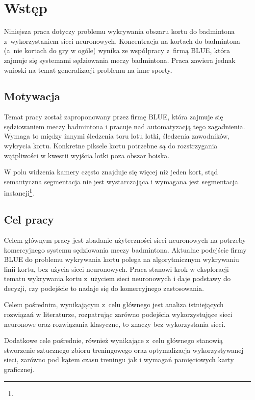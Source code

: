 \chapter{Wstęp}

Niniejsza praca dotyczy problemu wykrywania obszaru kortu do badmintona z~wykorzystaniem sieci neuronowych.
Koncentracja na kortach do badmintona (a~nie kortach do gry w ogóle) wynika ze współpracy z~firmą BLUE, która zajmuje się systemami sędziowania meczy badmintona.
Praca zawiera jednak wnioski na temat generalizacji problemu na inne sporty.

\section{Motywacja}

Temat pracy został zaproponowany przez firmę BLUE, która zajmuje się sędziowaniem meczy badmintona i pracuje nad automatyzacją tego zagadnienia.
Wymaga to między innymi śledzenia toru lotu lotki, śledzenia zawodników, wykrycia kortu.
Konkretne piksele kortu potrzebne są do rozstrzygania wątpliwości w kwestii wyjścia lotki poza obszar boiska.

W polu widzenia kamery często znajduje się więcej niż jeden kort, stąd semantyczna segmentacja nie jest wystarczająca i wymagana jest segmentacja instancji\footnote{}.

\section{Cel pracy}

Celem głównym pracy jest zbadanie użyteczności sieci neuronowych na potrzeby komercyjnego systemu sędziowania meczy badmintona.
Aktualne podejście firmy BLUE do problemu wykrywania kortu polega na algorytmicznym wykrywaniu linii kortu, bez użycia sieci neuronowych.
Praca stanowi krok w eksploracji tematu wykrywania kortu z~użyciem sieci neuronowych i daje podstawy do decyzji, czy podejście to nadaje się do komercyjnego zastosowania.

Celem pośrednim, wynikającym z~celu głównego jest analiza istniejących rozwiązań w literaturze, rozpatrując zarówno podejścia wykorzystujące sieci neuronowe oraz rozwiązania klasyczne, to znaczy bez wykorzystania sieci. 

Dodatkowe cele pośrednie, również wynikające z~celu głównego stanowią stworzenie sztucznego zbioru treningowego oraz optymalizacja wykorzystywanej sieci, zarówno pod kątem czasu treningu jak i wymagań pamięciowych karty graficznej.

